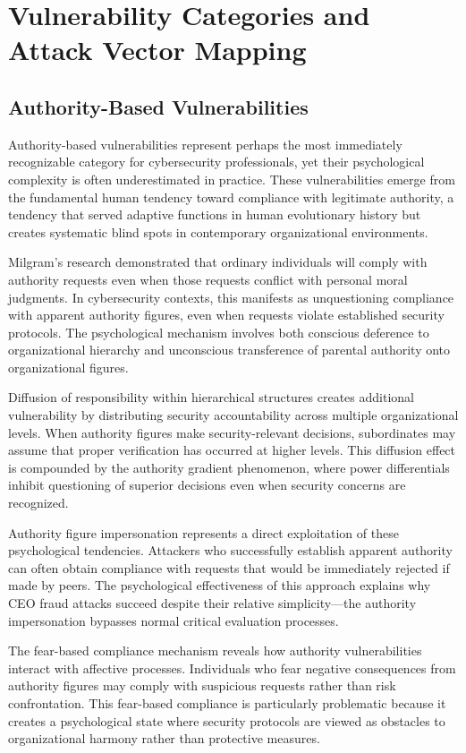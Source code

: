 \documentclass[11pt,a4paper]{article}
\begin{document}
\section{Vulnerability Categories and Attack Vector Mapping}

\subsection{Authority-Based Vulnerabilities}

Authority-based vulnerabilities represent perhaps the most immediately recognizable category for cybersecurity professionals, yet their psychological complexity is often underestimated in practice. These vulnerabilities emerge from the fundamental human tendency toward compliance with legitimate authority, a tendency that served adaptive functions in human evolutionary history but creates systematic blind spots in contemporary organizational environments.

Milgram's research demonstrated that ordinary individuals will comply with authority requests even when those requests conflict with personal moral judgments\cite{milgram1974}. In cybersecurity contexts, this manifests as unquestioning compliance with apparent authority figures, even when requests violate established security protocols. The psychological mechanism involves both conscious deference to organizational hierarchy and unconscious transference of parental authority onto organizational figures.

Diffusion of responsibility within hierarchical structures creates additional vulnerability by distributing security accountability across multiple organizational levels. When authority figures make security-relevant decisions, subordinates may assume that proper verification has occurred at higher levels. This diffusion effect is compounded by the authority gradient phenomenon, where power differentials inhibit questioning of superior decisions even when security concerns are recognized.

Authority figure impersonation represents a direct exploitation of these psychological tendencies. Attackers who successfully establish apparent authority can often obtain compliance with requests that would be immediately rejected if made by peers. The psychological effectiveness of this approach explains why CEO fraud attacks succeed despite their relative simplicity—the authority impersonation bypasses normal critical evaluation processes.

The fear-based compliance mechanism reveals how authority vulnerabilities interact with affective processes. Individuals who fear negative consequences from authority figures may comply with suspicious requests rather than risk confrontation. This fear-based compliance is particularly problematic because it creates a psychological state where security protocols are viewed as obstacles to organizational harmony rather than protective measures.
\end{document}
